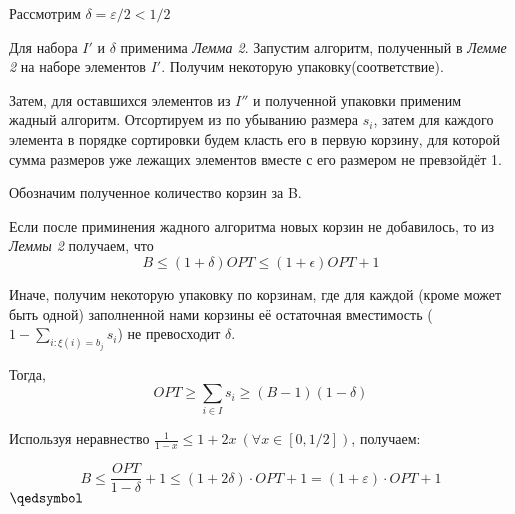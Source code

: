 \documentclass[a4paper,14pt,russian]{article}
\begin{document}
Рассмотрим $\delta = \varepsilon / 2 < 1/2$

Для набора $I'$ и $\delta$ применима \textit{Лемма 2}. Запустим алгоритм, полученный в \textit{Лемме 2} на наборе элементов $I'$. Получим некоторую упаковку(соответствие). 

Затем, для оставшихся элементов из $I''$ и полученной упаковки применим жадный алгоритм. Отсортируем из по убыванию размера $s_i$, затем для каждого элемента в порядке сортировки будем класть его в первую корзину, для которой сумма размеров уже лежащих элементов вместе с его размером не превзойдёт 1.

Обозначим полученное количество корзин за B.

Если после приминения жадного алгоритма новых корзин не добавилось, то из \textit{Леммы 2} получаем, что  
$$ B \leq (1 + \delta)OPT \leq (1 + \epsilon)OPT + 1$$

Иначе, получим некоторую упаковку по корзинам, где для каждой (кроме может быть одной) заполненной нами корзины её остаточная вместимость ($1 - \sum_{i: \xi(i) = b_j} s_i$) не превосходит $\delta$. 

Тогда, 
$$OPT \geq \sum_{i \in I} s_i \geq (B - 1)(1 - \delta)$$

Используя неравнество $\frac{1}{1 - x} \leq 1 + 2x \: (\forall x \in [0, 1/2])$, получаем:

$$ B \leq \frac{OPT}{1 - \delta} + 1 \leq (1 + 2\delta) \cdot OPT + 1 =  (1 + \varepsilon) \cdot OPT + 1 $$ 
$\qedsymbol$
  
  
\newpage



\renewcommand\refname{\centering Список литературы}
\begin{thebibliography}{9}


   
\end{thebibliography}
\end{document}
